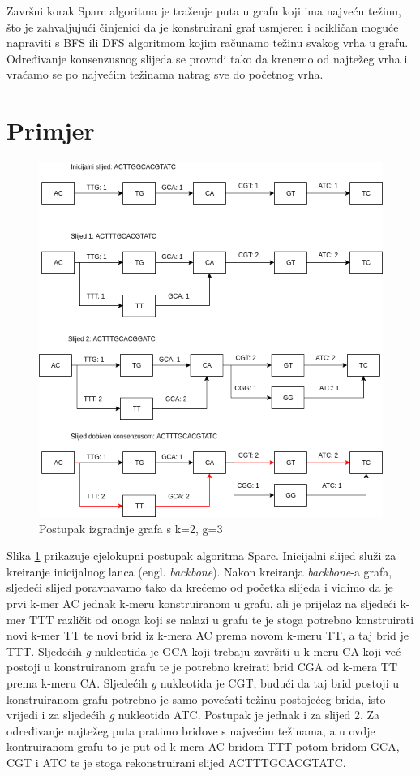 \documentclass[times, utf8, seminar, numeric]{fer}
\begin{document}
Završni korak Sparc algoritma je traženje puta u grafu koji ima najveću težinu, što je zahvaljujući činjenici da je konstruirani graf usmjeren i acikličan moguće napraviti s BFS ili DFS algoritmom kojim računamo težinu svakog vrha u grafu. Određivanje konsenzusnog slijeda se provodi tako da krenemo od najtežeg vrha i vraćamo se po najvećim težinama natrag sve do početnog vrha.

\section{Primjer}
\begin{figure}[htb]
	\centering
	\includegraphics[scale=0.6]{images/backbone.png}
	\caption{Postupak izgradnje grafa s k=2, g=3}
	\label{picture:example}
\end{figure}

Slika \ref{picture:example} prikazuje cjelokupni postupak algoritma Sparc. Inicijalni slijed služi za kreiranje inicijalnog lanca (engl. \emph{backbone}). Nakon kreiranja \emph{backbone}-a grafa, sljedeći slijed poravnavamo tako da krećemo od početka slijeda i vidimo da je prvi k-mer AC jednak k-meru konstruiranom u grafu, ali je prijelaz na sljedeći k-mer TTT različit od onoga koji se nalazi u grafu te je stoga potrebno konstruirati novi k-mer TT te novi brid iz k-mera AC prema novom k-meru TT, a taj brid je TTT. Sljedećih \emph{g} nukleotida je GCA koji trebaju završiti u k-meru CA koji već postoji u konstruiranom grafu te je potrebno kreirati brid CGA od k-mera TT prema k-meru CA. Sljedećih \emph{g} nukleotida je CGT, budući da taj brid postoji u konstruiranom grafu potrebno je samo povećati težinu postojećeg brida, isto vrijedi i za sljedećih \emph{g} nukleotida ATC. Postupak je jednak i za slijed 2. Za određivanje najtežeg puta pratimo bridove s najvećim težinama, a u ovdje kontruiranom grafu to je put od k-mera AC bridom TTT potom bridom GCA, CGT i ATC te je stoga rekonstruirani slijed ACTTTGCACGTATC.
\end{document}
